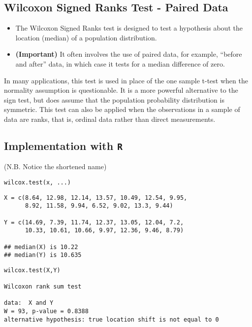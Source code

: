 \documentclass[12pt, a4paper]{report}
\theoremstyle{plain}
\theoremstyle{definition}
\theoremstyle{remark}
\begin{document}
\subsection*{Wilcoxon Signed Ranks Test - Paired Data}
\begin{itemize}
\item The Wilcoxon Signed Ranks test is designed to test a hypothesis about the location (median) of a
population distribution. 
\item \textbf{(Important)} It often involves the use of paired data, for example, “before and after”
data, in which case it tests for a median difference of zero.

\end{itemize}

In many applications, this test is used in place of the one sample t-test when the normality
assumption is questionable. It is a more powerful alternative to the sign test, but does assume that
the population probability distribution is symmetric.
This test can also be applied when the observations in a sample of data are ranks, that is, ordinal
data rather than direct measurements.

\subsection*{Implementation with \texttt{R}}
(N.B. Notice the shortened name)
\begin{framed}
\begin{verbatim}
wilcox.test(x, ...)
\end{verbatim}
\end{framed}
\begin{framed}
\begin{verbatim}
X = c(8.64, 12.98, 12.14, 13.57, 10.49, 12.54, 9.95, 
      8.92, 11.58, 9.94, 6.52, 9.02, 13.3, 9.44)

Y = c(14.69, 7.39, 11.74, 12.37, 13.05, 12.04, 7.2, 
      10.33, 10.61, 10.66, 9.97, 12.36, 9.46, 8.79)

## median(X) is 10.22
## median(Y) is 10.635
\end{verbatim}
\end{framed}
\begin{framed}
\begin{verbatim}
wilcox.test(X,Y)

Wilcoxon rank sum test

data:  X and Y
W = 93, p-value = 0.8388
alternative hypothesis: true location shift is not equal to 0
\end{verbatim}
\end{framed}
\newpage
\end{document}
